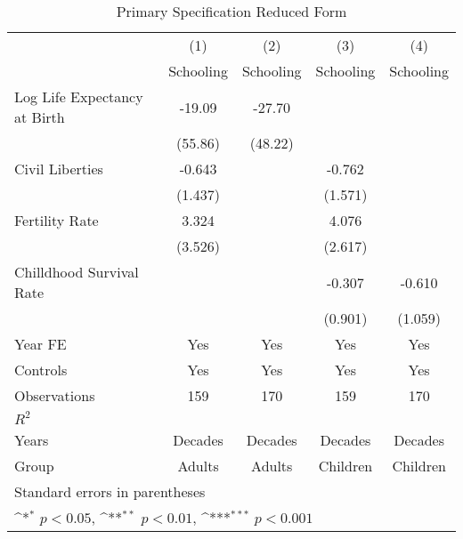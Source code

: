 \begin{table}[htbp]\centering
\def\sym#1{\ifmmode^{#1}\else\(^{#1}\)\fi}
\caption{Primary Specification Reduced Form}
\begin{tabular}{l*{4}{c}}
\toprule
                &\multicolumn{1}{c}{(1)}&\multicolumn{1}{c}{(2)}&\multicolumn{1}{c}{(3)}&\multicolumn{1}{c}{(4)}\\
                &\multicolumn{1}{c}{Schooling}&\multicolumn{1}{c}{Schooling}&\multicolumn{1}{c}{Schooling}&\multicolumn{1}{c}{Schooling}\\
\midrule
Log Life Expectancy at Birth&   -19.09         &   -27.70         &                  &                  \\
                &  (55.86)         &  (48.22)         &                  &                  \\
\addlinespace
Civil Liberties &   -0.643         &                  &   -0.762         &                  \\
                &  (1.437)         &                  &  (1.571)         &                  \\
\addlinespace
Fertility Rate  &    3.324         &                  &    4.076         &                  \\
                &  (3.526)         &                  &  (2.617)         &                  \\
\addlinespace
Chilldhood Survival Rate&                  &                  &   -0.307         &   -0.610         \\
                &                  &                  &  (0.901)         &  (1.059)         \\
\addlinespace
Year FE         &      Yes         &      Yes         &      Yes         &      Yes         \\
\addlinespace
Controls        &      Yes         &      Yes         &      Yes         &      Yes         \\
\midrule
Observations    &      159         &      170         &      159         &      170         \\
\(R^{2}\)       &                  &                  &                  &                  \\
Years           &  Decades         &  Decades         &  Decades         &  Decades         \\
Group           &   Adults         &   Adults         & Children         & Children         \\
\bottomrule
\multicolumn{5}{l}{\footnotesize Standard errors in parentheses}\\
\multicolumn{5}{l}{\footnotesize \sym{*} \(p<0.05\), \sym{**} \(p<0.01\), \sym{***} \(p<0.001\)}\\
\end{tabular}
\end{table}
